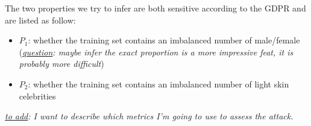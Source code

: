 \documentclass[11pt]{article}
\begin{document}
The two properties we try to infer are both sensitive according to the GDPR and are listed as follow:
\begin{itemize}
  \item $P_1$: whether the training set contains an imbalanced number of male/female (\textit{\underline{question}: maybe infer the exact proportion is a more impressive feat, it is probably more difficult})
  \item $P_2$: whether the training set contains an imbalanced number of light skin celebrities
\end{itemize}
\textit{\underline{to add}: I want to describe which metrics I'm going to use to assess the attack.}


%


\end{document}
